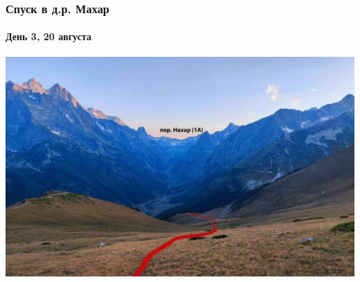 \begin{frame}
	\frametitle{Спуск в д.р. Махар}
	\framesubtitle{День 3, 20 августа}
	\centering
	\includegraphics[width=\textwidth]{../pics/IMG_20240820_184645.jpg}			
\end{frame}

